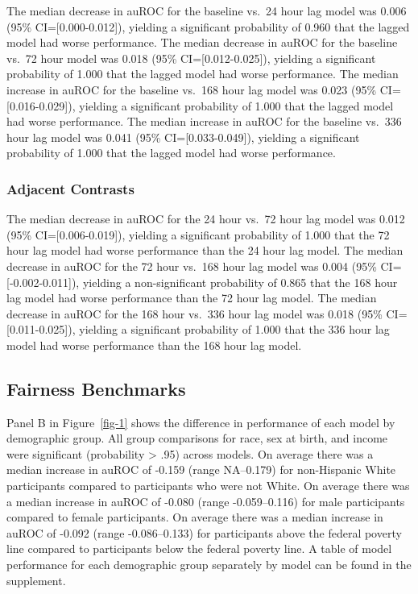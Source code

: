\documentclass[
]{agujournal2019}
\begin{document}
The median decrease in auROC for the baseline vs.~24 hour lag model was
0.006 (95\% CI={[}0.000-0.012{]}), yielding a significant probability of
0.960 that the lagged model had worse performance. The median decrease
in auROC for the baseline vs.~72 hour model was 0.018 (95\%
CI={[}0.012-0.025{]}), yielding a significant probability of 1.000 that
the lagged model had worse performance. The median increase in auROC for
the baseline vs.~168 hour lag model was 0.023 (95\%
CI={[}0.016-0.029{]}), yielding a significant probability of 1.000 that
the lagged model had worse performance. The median increase in auROC for
the baseline vs.~336 hour lag model was 0.041 (95\%
CI={[}0.033-0.049{]}), yielding a significant probability of 1.000 that
the lagged model had worse performance.

\subsubsection{Adjacent Contrasts}\label{adjacent-contrasts}

The median decrease in auROC for the 24 hour vs.~72 hour lag model was
0.012 (95\% CI={[}0.006-0.019{]}), yielding a significant probability of
1.000 that the 72 hour lag model had worse performance than the 24 hour
lag model. The median decrease in auROC for the 72 hour vs.~168 hour lag
model was 0.004 (95\% CI={[}-0.002-0.011{]}), yielding a non-significant
probability of 0.865 that the 168 hour lag model had worse performance
than the 72 hour lag model. The median decrease in auROC for the 168
hour vs.~336 hour lag model was 0.018 (95\% CI={[}0.011-0.025{]}),
yielding a significant probability of 1.000 that the 336 hour lag model
had worse performance than the 168 hour lag model.

\subsection{Fairness Benchmarks}\label{fairness-benchmarks-1}

Panel B in Figure~\ref{fig-1} shows the difference in performance of
each model by demographic group. All group comparisons for race, sex at
birth, and income were significant (probability \textgreater{} .95)
across models. On average there was a median increase in auROC of -0.159
(range NA--0.179) for non-Hispanic White participants compared to
participants who were not White. On average there was a median increase
in auROC of -0.080 (range -0.059--0.116) for male participants compared
to female participants. On average there was a median increase in auROC
of -0.092 (range -0.086--0.133) for participants above the federal
poverty line compared to participants below the federal poverty line. A
table of model performance for each demographic group separately by
model can be found in the supplement.
\end{document}
